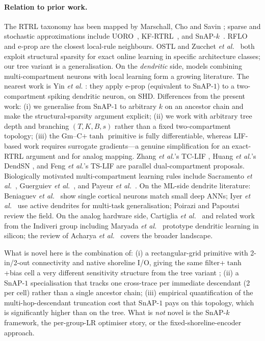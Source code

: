 \documentclass[11pt]{article}
\begin{document}
\paragraph{Relation to prior work.}
The RTRL taxonomy has been mapped by Marschall, Cho and Savin
\cite{marschall2020}; sparse and stochastic approximations include
UORO~\cite{tallec2018}, KF-RTRL~\cite{mujika2018}, and
SnAP-$k$~\cite{menick2021}. RFLO~\cite{murray2019} and e-prop
\cite{bellec2020} are the closest local-rule neighbours. OSTL
\cite{bohnstingl2023} and Zucchet \emph{et al.}~\cite{zucchet2023} both
exploit structural sparsity for exact online learning in specific
architecture classes; our tree variant is a generalisation. On the
\emph{dendritic} side, models combining multi-compartment neurons with local
learning form a growing literature. The nearest work is Yin \emph{et al.}
\cite{yin2024}: they apply e-prop (equivalent to SnAP-$1$) to a
two-compartment spiking dendritic neuron, on SHD. Differences from the
present work: (i) we generalise from SnAP-$1$ to arbitrary $k$ on an
ancestor chain and make the structural-sparsity argument explicit; (ii)
we work with arbitrary tree depth and branching $(T, K, B, s)$ rather than
a fixed two-compartment topology; (iii) the Gm--C$+\tanh$ primitive is
fully differentiable, whereas LIF-based work requires surrogate
gradients---a genuine simplification for an exact-RTRL argument and for
analog mapping. Zhang \emph{et al.}'s TC-LIF \cite{zhang2024tclif},
Huang \emph{et al.}'s DendSN \cite{huang2024dendsn}, and Feng \emph{et
al.}'s TS-LIF \cite{feng2025tslif} are parallel dual-compartment
proposals. Biologically motivated multi-compartment learning
rules include Sacramento \emph{et al.}~\cite{sacramento2018},
Guerguiev \emph{et al.}~\cite{guerguiev2017}, and
Payeur \emph{et al.}~\cite{payeur2021}. On the ML-side dendrite literature:
Beniaguev \emph{et al.}~\cite{beniaguev2021} show single cortical neurons
match small deep ANNs; Iyer \emph{et al.}~\cite{iyer2022} use active
dendrites for multi-task generalisation; Poirazi and
Papoutsi~\cite{poirazi2020} review the field. On the analog hardware side,
Cartiglia \emph{et al.}~\cite{cartiglia2022} and related work from the
Indiveri group including Maryada \emph{et al.}~\cite{maryada2025} prototype
dendritic learning in silicon; the review of
Acharya \emph{et al.}~\cite{acharya2021} covers the broader landscape.

What is novel here is the combination of: (i) a rectangular-grid
primitive with 2-in/2-out connectivity and native shoreline I/O,
giving the same filter+$\tanh$+bias cell a very different sensitivity
structure from the tree variant \cite{tree-neurons}; (ii) a SnAP-$1$
specialisation that tracks one cross-trace per immediate descendant
(2 per cell) rather than a single ancestor chain; (iii) empirical
quantification of the multi-hop-descendant truncation cost that
SnAP-$1$ pays on this topology, which is significantly higher than on
the tree. What is \emph{not} novel is the SnAP-$k$ framework, the
per-group-LR optimiser story, or the fixed-shoreline-encoder approach.
\end{document}
